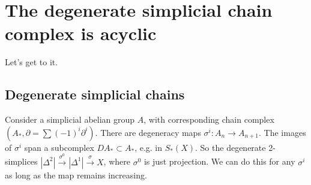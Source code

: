 \section{The degenerate simplicial chain complex is acyclic} 
Let's get to it.
\subsection{Degenerate simplicial chains}
Consider a simplicial abelian group $A$, with corresponding chain complex $(A_*, \partial =\sum(-1)^i  \partial ^i )$. There are degeneracy maps $\sigma^i  \colon A_n  \to A_{n+1} $. The images of $\sigma^i $ span a subcomplex $DA_* \subset A_*$, e.g. in  $S_*(X)$. So the degenerate 2-simplices $|\Delta ^2|\xrightarrow{\sigma^0} |\Delta ^1| \xrightarrow{\sigma} X $, where $\sigma^0$ is just projection. We can do this for any $\sigma^i $ as long as the map remains increasing.

